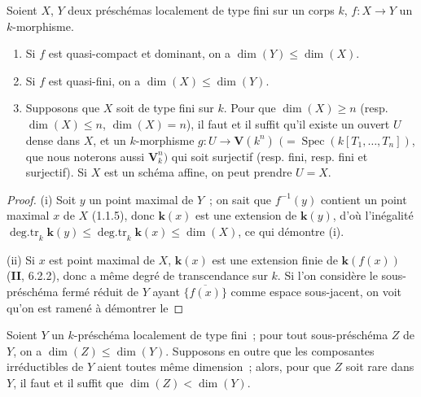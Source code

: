 \begin{theorem}[4.1.2]
\label{IV.2.4.1.2-fr}
Soient $X$, $Y$ deux préschémas localement de type fini sur un corps $k$,
$f:X\to Y$ un $k$-morphisme.


\begin{enumerate}
\item[\textup{(i)}] Si $f$ est quasi-compact et dominant, on a
$\dim(Y)\leqslant\dim(X)$.
\item[\textup{(ii)}] Si $f$ est quasi-fini, on a
$\dim(X)\leqslant\dim(Y)$.
\item[\textup{(iii)}] Supposons que $X$ soit de type fini sur $k$. Pour que
$\dim(X)\geqslant n$ \textup{(resp. $\dim(X)\leqslant n$, $\dim(X)=n$)}, il faut et il
suffit qu'il existe un ouvert $U$ dense dans $X$, et un $k$-morphisme
$g:U\longrightarrow\mathbf V(k^n)$
$(=\operatorname{Spec}(k[T_1,\ldots,T_n])$,
que nous noterons aussi $\mathbf V_k^n)$ qui soit surjectif \textup{(resp.} fini,
\textup{resp.} fini et surjectif\textup{)}. Si $X$ est un schéma affine, on peut prendre $U=X$.
\end{enumerate}
\end{theorem}

\begin{proof}
(i) Soit $y$ un point maximal de $Y$~; on sait que $f^{-1}(y)$ contient un
point maximal $x$ de $X$ (1.1.5), donc $\boldsymbol{k}(x)$ est une extension de $\boldsymbol{k}(y)$,
d'où l'inégalité
$\operatorname{deg.tr}_k \boldsymbol{k}(y)
\leqslant\operatorname{deg.tr}_k \boldsymbol{k}(x)
\leqslant\dim(X)$,
ce qui démontre (i).

(ii) Si $x$ est point maximal de $X$, $\boldsymbol{k}(x)$ est une extension finie de
$\boldsymbol{k}(f(x))$ (\textbf{II}, 6.2.2), donc a même degré de transcendance sur $k$. Si l'on
considère le sous-préschéma fermé réduit de $Y$ ayant $\overline{\{f(x)\}}$
comme espace sous-jacent, on voit qu'on est ramené à démontrer le
\end{proof}

\begin{corollary}[4.1.2.1]
\label{IV.2.4.1.2.1-fr}
Soient $Y$ un $k$-préschéma localement de type fini~; pour tout sous-préschéma
$Z$ de $Y$, on a $\dim(Z)\leqslant\dim(Y)$. Supposons en outre que les
composantes irréductibles de $Y$ aient toutes même dimension~; alors, pour que
$Z$ soit rare dans $Y$, il faut et il suffit que
$\dim(Z)<\dim(Y)$.
\end{corollary}

